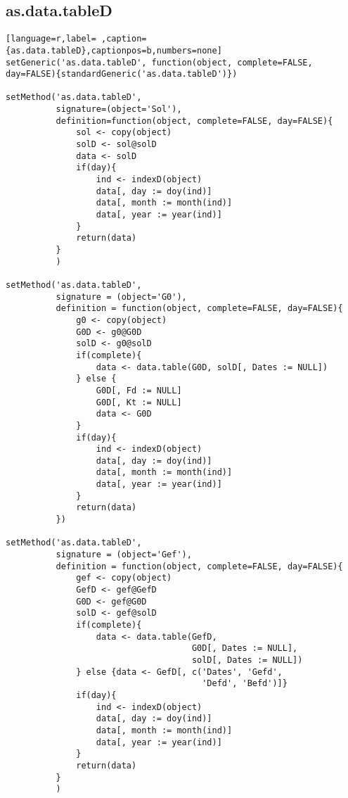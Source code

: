 \subsection{as.data.tableD}
\label{sec:org4098811}
\label{subsec:as.data.tabled}
\begin{lstlisting}[language=r,label= ,caption={as.data.tableD},captionpos=b,numbers=none]
setGeneric('as.data.tableD', function(object, complete=FALSE, day=FALSE){standardGeneric('as.data.tableD')})

setMethod('as.data.tableD',
          signature=(object='Sol'),
          definition=function(object, complete=FALSE, day=FALSE){
              sol <- copy(object)
              solD <- sol@solD
              data <- solD
              if(day){
                  ind <- indexD(object)
                  data[, day := doy(ind)]
                  data[, month := month(ind)]
                  data[, year := year(ind)]
              }
              return(data)
          }
          )

setMethod('as.data.tableD',
          signature = (object='G0'),
          definition = function(object, complete=FALSE, day=FALSE){
              g0 <- copy(object)
              G0D <- g0@G0D
              solD <- g0@solD
              if(complete){
                  data <- data.table(G0D, solD[, Dates := NULL])
              } else {
                  G0D[, Fd := NULL]
                  G0D[, Kt := NULL]
                  data <- G0D
              }
              if(day){
                  ind <- indexD(object)
                  data[, day := doy(ind)]
                  data[, month := month(ind)]
                  data[, year := year(ind)]
              }
              return(data)
          })

setMethod('as.data.tableD',
          signature = (object='Gef'),
          definition = function(object, complete=FALSE, day=FALSE){
              gef <- copy(object)
              GefD <- gef@GefD
              G0D <- gef@G0D
              solD <- gef@solD
              if(complete){
                  data <- data.table(GefD,
                                     G0D[, Dates := NULL],
                                     solD[, Dates := NULL])
              } else {data <- GefD[, c('Dates', 'Gefd',
                                       'Defd', 'Befd')]}
              if(day){
                  ind <- indexD(object)
                  data[, day := doy(ind)]
                  data[, month := month(ind)]
                  data[, year := year(ind)]     
              }
              return(data)
          }
          )


\end{lstlisting}
